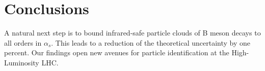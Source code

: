 \section{Conclusions}\label{sec:conclusions}

A natural next step is to bound infrared-safe particle clouds of B meson
decays to all orders in $\alpha_s$. This leads to a reduction of the
theoretical uncertainty by one percent. Our findings open new avenues
for particle identification at the High-Luminosity LHC.

